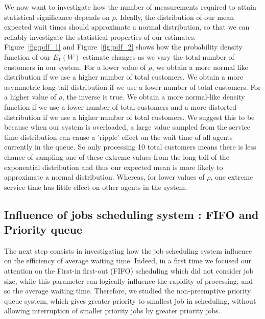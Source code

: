 \documentclass{article}
\begin{document}
    We now want to investigate how the number of measurements required to attain statistical significance depends on $\rho$. Ideally, the distribution of our mean expected wait times should approximate a normal distribution, so that we can reliably investigate the statistical properties of our estimates.\\
    Figure~\ref{fig:pdf_1} and Figure~\ref{fig:pdf_2} shows how the probability density function of our $E_1(W)$ estimate changes as we vary the total number of customers in our system. For a lower value of $\rho$, we obtain a more normal like distribution if we use a higher number of total customers. We obtain a more asymmetric long-tail distribution if we use a lower number of total customers. For a higher value of $\rho$, the inverse is true. We obtain a more normal-like density function if we use a lower number of total customers and a more distorted distribution if we use a higher number of total customers. We suggest this to be because when our system is overloaded, a large value sampled from the service time distribution can cause a 'ripple' effect on the wait time of all agents currently in the queue. So only processing 10 total customers means there is less chance of sampling one of these extreme values from the long-tail of the exponential distribution and thus our expected mean is more likely to approximate a normal distribution. Whereas, for lower values of $\rho$, one extreme service time has little effect on other agents in the system.\\

    \subsection*{Influence of jobs scheduling system : FIFO and Priority queue}

    The next step consists in investigating how the job scheduling system influence on the efficiency of average waiting time.
    Indeed, in a first time we focused our attention on the First-in first-out (FIFO) scheduling which did not consider job size, while this parameter can logically influence the rapidity of processing, and so the average waiting time.
    Therefore, we studied the non-preemptive priority queue system, which gives greater priority to smallest job in scheduling, without allowing interruption of smaller priority jobs by greater priority jobs.\\
\end{document}
